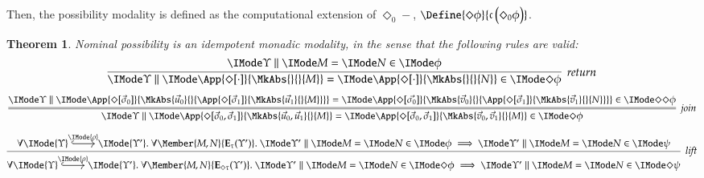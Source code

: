 \documentclass[11pt]{article}
\newtheorem{thm}{Theorem}[section]
\theoremstyle{definition}
\theoremstyle{notation}
\theoremstyle{remark}
\numberwithin{equation}{section}
\newcommand\Exprs{\mathbf{E}}
\begin{document}
Then, the possibility modality is defined as the computational extension of
$\Diamond_0-$, $\Define{\Diamond\phi}{\VToCType\left(\Diamond_0\phi\right)}$.


\begin{thm}

  Nominal possibility is an idempotent monadic modality, in the sense that the
  following rules are valid:
%
  \[
    \infer[\textit{return}]{
      \RMemEq{\Upsilon}{
        \App{
          \Diamond[\cdot]
        }{
          \MkAbs{}{}{M}
        }
      }{
        \App{
          \Diamond[\cdot]
        }{
          \MkAbs{}{}{N}
        }
      }{\Diamond\phi}
    }{
      \RMemEq{\Upsilon}{M}{N}{\phi}
    }
  \]
  \[
    \infer=[\textit{join}]{
      \RMemEq{\Upsilon}{
        \App{
          \Diamond[\vec{\sigma}_0,\vec{\sigma}_1]
        }{
          \MkAbs{\vec{u}_0,\vec{u}_1}{}{M}
        }
      }{
        \App{
          \Diamond[\vec{\sigma}_0,\vec{\sigma}_1]
        }{
          \MkAbs{\vec{v}_0,\vec{v}_1}{}{M}
        }
      }{\Diamond\phi}
    }{
      \RMemEq{\Upsilon}{
        \App{
          \Diamond[\vec{\sigma}_0]
        }{
          \MkAbs{\vec{u}_0}{}{
            \App{
              \Diamond[\vec{\sigma}_1]
            }{
              \MkAbs{\vec{u}_1}{}{M}
            }
          }
        }
      }{
        \App{
          \Diamond[\vec{\sigma_0}]
        }{
          \MkAbs{\vec{v}_0}{}{
            \App{
              \Diamond[\vec{\sigma}_1]
            }{
              \MkAbs{\vec{v}_1}{}{N}
            }
          }
        }
      }{\Diamond\Diamond\phi}
    }
  \]
  \[
    \infer[\textit{lift}]{
      \forall
        \begin{tikzcd}[cramped, ampersand replacement = \&]
          \IMode{\Upsilon} \arrow[r,hook,"\IMode{\rho}"] \&\IMode{\Upsilon'}
        \end{tikzcd}.\
      \forall\Member{M,N}{\Exprs_{\Diamond\tau}(\Upsilon')}.\
      \RMemEq{\Upsilon'}{M}{N}{\Diamond\phi}
      \implies
      \RMemEq{\Upsilon'}{M}{N}{\Diamond\psi}
    }{
      \forall
        \begin{tikzcd}[cramped, ampersand replacement = \&]
          \IMode{\Upsilon} \arrow[r,hook,"\IMode{\rho}"] \&\IMode{\Upsilon'}
        \end{tikzcd}.\
      \forall\Member{M,N}{\Exprs_\tau(\Upsilon')}.\
      \RMemEq{\Upsilon'}{M}{N}{\phi}
      \implies
      \RMemEq{\Upsilon'}{M}{N}{\psi}
    }
  \]
\end{thm}
\end{document}
